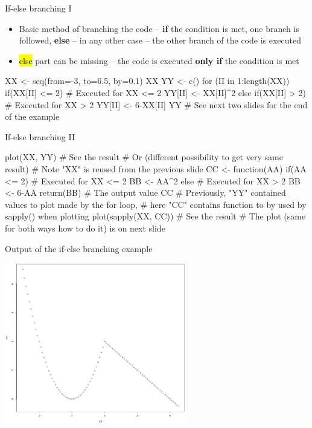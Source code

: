 \documentclass[compress, ucs, xelatex, 11pt, xcolor=svgnames,
  hyperref={
    bookmarks=true,
    unicode=true,
    colorlinks=true,
    pdftitle={Molecular data in R},
    plainpages=false,
    pdfauthor={Vojtech Zeisek},
    pdfsubject={Course about phylogeny and evolution in R},
    pdfcreator={XeLaTeX},
    pdfkeywords={R, evolution, phylogeny, molecular data},
    linkcolor=Tomato,
    anchorcolor=SaddleBrown,
    citecolor=Goldenrod,
    filecolor=DarkMagenta,
    menucolor=Sienna,
    urlcolor=DarkTurquoise,
    pdftex},
  url={hyphens, lowtilde} %
  ]{beamer}
\renewcommand{\texttt}[1]{\hl{\ttfamily #1}}
\begin{document}
\begin{frame}[fragile]{If-else branching I}
  \begin{itemize}
    \item Basic method of branching the code -- \textbf{if} the condition is met, one branch is followed, \textbf{else} -- in any other case -- the other branch of the code is executed
    \item \texttt{else} part can be missing -- the code is executed \textbf{only if} the condition is met
  \end{itemize}
  \begin{spluscode}
    XX <- seq(from=-3, to=6.5, by=0.1)
    XX
    YY <- c()
    for (II in 1:length(XX)) {
      if(XX[II] <= 2) { # Executed for XX <= 2
        YY[II] <- XX[II]^2
        } else if(XX[II] > 2) { # Executed for XX > 2
          YY[II] <- 6-XX[II]
          }
      }
    YY # See next two slides for the end of the example
  \end{spluscode}
\end{frame}

\begin{frame}[fragile]{If-else branching II}
  \begin{spluscode}
    plot(XX, YY) # See the result
    # Or (different possibility to get very same result)
    # Note "XX" is reused from the previous slide
    CC <- function(AA) {
      if(AA <= 2) { # Executed for XX <= 2
        BB <- AA^2
      } else { # Executed for XX > 2
        BB <- 6-AA
        }
      return(BB) # The output value
      }
     CC # Previously, "YY" contained values to plot made by the for loop,
        # here "CC" contains function to by used by sapply() when plotting
     plot(sapply(XX, CC)) # See the result
    # The plot (same for both ways how to do it) is on next slide
  \end{spluscode}
\end{frame}

\begin{frame}{Output of the if-else branching example}
  \begin{center}
    \includegraphics[height=7cm]{if-else.png}
  \end{center}
\end{frame}
\end{document}
